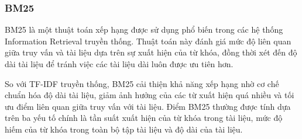 




\subsubsection{BM25}

BM25 là một thuật toán xếp hạng được sử dụng phổ biến trong các hệ thống Information Retrieval truyền thống. Thuật toán này đánh giá mức độ liên quan giữa truy vấn và tài liệu dựa trên sự xuất hiện của từ khóa, đồng thời xét đến độ dài tài liệu để tránh việc các tài liệu dài luôn được ưu tiên hơn.

So với TF-IDF truyền thống, BM25 cải thiện khả năng xếp hạng nhờ cơ chế chuẩn hóa độ dài tài liệu, giảm ảnh hưởng của các từ xuất hiện quá nhiều và tối ưu điểm liên quan giữa truy vấn với tài liệu. Điểm BM25 thường được tính dựa trên ba yếu tố chính là tần suất xuất hiện của từ khóa trong tài liệu, mức độ hiếm của từ khóa trong toàn bộ tập tài liệu và độ dài của tài liệu.

